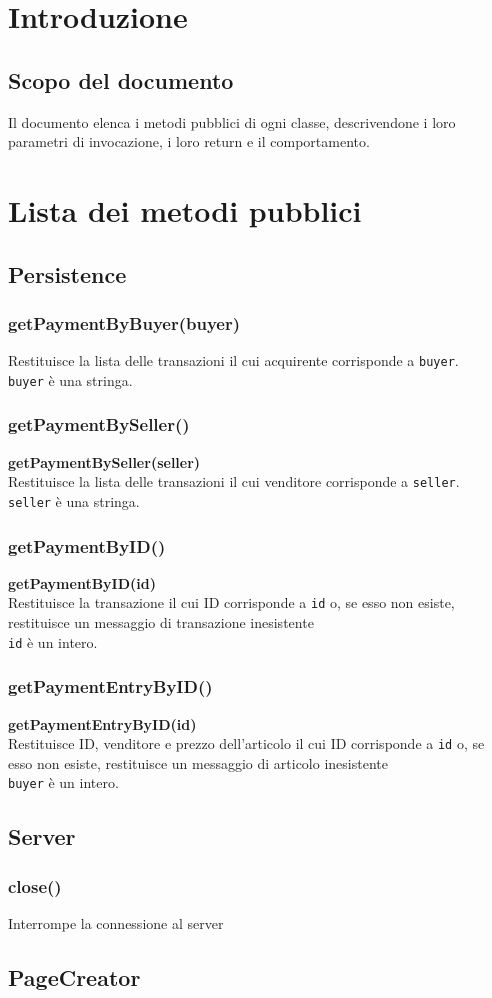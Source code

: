 \documentclass[a4paper, 12pt]{article}
\begin{document}
\makefrontpage

\makeversioni

\section{Introduzione}
\subsection{Scopo del documento}
Il documento elenca i metodi pubblici di ogni classe, descrivendone i loro parametri di invocazione, i loro return e il comportamento.

\section{Lista dei metodi pubblici}
\subsection{Persistence}

\subsubsection{getPaymentByBuyer(buyer)}
Restituisce la lista delle transazioni il cui acquirente corrisponde a \texttt{buyer}. \\
\texttt{buyer} è una stringa.

\subsubsection{getPaymentBySeller()}
\textbf{getPaymentBySeller(seller)} \\
Restituisce la lista delle transazioni il cui venditore corrisponde a \texttt{seller}. \\
\texttt{seller} è una stringa.

\subsubsection{getPaymentByID()}
\textbf{getPaymentByID(id)} \\
Restituisce la transazione il cui ID corrisponde a \texttt{id} o, se esso non esiste, restituisce un messaggio di transazione inesistente \\
\texttt{id} è un intero.

\subsubsection{getPaymentEntryByID()}
\textbf{getPaymentEntryByID(id)} \\
Restituisce ID, venditore e prezzo dell'articolo il cui ID corrisponde a \texttt{id} o, se esso non esiste, restituisce un messaggio di articolo inesistente \\
\texttt{buyer} è un intero.

\subsection{Server}
\subsubsection{close()}
Interrompe la connessione al server

\subsection{PageCreator}
\end{document}
